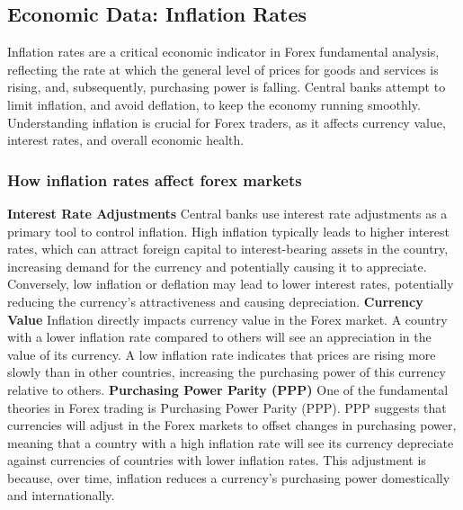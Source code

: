 \documentclass{report}
\begin{document}
     \bigbreak \noindent 
     \subsection{Economic Data: Inflation Rates}
     \bigbreak \noindent 
     \begin{concept}
         Inflation rates are a critical economic indicator in Forex fundamental analysis, reflecting the rate at which the general level of prices for goods and services is rising, and, subsequently, purchasing power is falling. Central banks attempt to limit inflation, and avoid deflation, to keep the economy running smoothly. Understanding inflation is crucial for Forex traders, as it affects currency value, interest rates, and overall economic health.
     \end{concept}

     \bigbreak \noindent 
     \subsubsection{How inflation rates affect forex markets}
     \bigbreak \noindent 
     \textbf{Interest Rate Adjustments}
     \bigbreak \noindent 
     Central banks use interest rate adjustments as a primary tool to control inflation. High inflation typically leads to higher interest rates, which can attract foreign capital to interest-bearing assets in the country, increasing demand for the currency and potentially causing it to appreciate. Conversely, low inflation or deflation may lead to lower interest rates, potentially reducing the currency's attractiveness and causing depreciation.
     \bigbreak \noindent 
     \textbf{Currency Value}
     \bigbreak \noindent 
     Inflation directly impacts currency value in the Forex market. A country with a lower inflation rate compared to others will see an appreciation in the value of its currency. A low inflation rate indicates that prices are rising more slowly than in other countries, increasing the purchasing power of this currency relative to others.
     \bigbreak \noindent 
     \textbf{Purchasing Power Parity (PPP)}
     \bigbreak \noindent 
     One of the fundamental theories in Forex trading is Purchasing Power Parity (PPP). PPP suggests that currencies will adjust in the Forex markets to offset changes in purchasing power, meaning that a country with a high inflation rate will see its currency depreciate against currencies of countries with lower inflation rates. This adjustment is because, over time, inflation reduces a currency's purchasing power domestically and internationally.
     \bigbreak \noindent 
\end{document}
